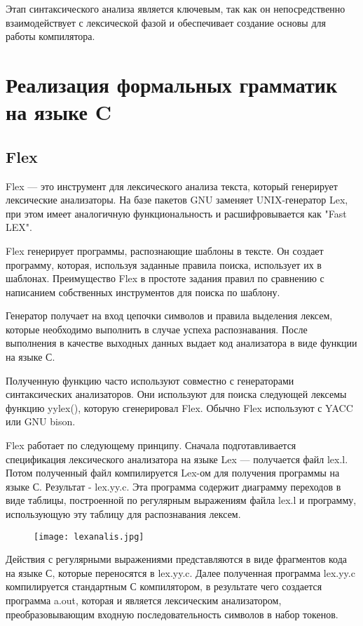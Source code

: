 \documentclass[bachelor, och, coursework, times]{SCWorks}
\begin{document}
Этап синтаксического анализа является ключевым, так как он непосредственно взаимодействует с лексической фазой и обеспечивает создание основы для работы компилятора.~\cite{Compilers}

\section{Реализация формальных грамматик на языке C}
\subsection{Flex}

Flex --- это инструмент для лексического анализа текста, который генерирует лексические анализаторы. На базе пакетов GNU заменяет UNIX-генератор Lex, при этом имеет аналогичную функциональность и расшифровывается как "Fast LEX".

Flex генерирует программы, распознающие шаблоны в тексте. Он создает программу, которая, используя заданные правила поиска, использует их в шаблонах. Преимущество Flex в простоте задания правил по сравнению с написанием собственных инструментов для поиска по шаблону.

Генератор получает на вход цепочки символов и правила выделения лексем, которые необходимо выполнить в случае успеха распознавания. После выполнения в качестве выходных данных выдает код анализатора в виде функции на языке С.

Полученную функцию часто используют совместно с генераторами синтаксических анализаторов. Они используют для поиска следующей лексемы функцию yylex(), которую сгенерировал Flex. Обычно Flex используют с YACC или GNU bison. 

Flex работает по следующему принципу. Сначала подготавливается спецификация лексического анализатора на языке Lex --- получается файл lex.l. Потом полученный файл компилируется Lex-ом для получения программы на языке С. Результат - lex.yy.c. Эта программа содержит диаграмму переходов в виде таблицы, построенной по регулярным выражениям файла lex.l и программу, использующую эту таблицу для распознавания лексем.

\begin{figure}  [!ht]
	\centering
	\texttt{[image: lexanalis.jpg]}
\end{figure}

Действия с регулярными выражениями представляются в виде фрагментов кода на языке С, которые переносятся в lex.yy.c. Далее полученная программа lex.yy.c компилируется стандартным С компилятором, в результате чего создается программа a.out, которая и является лексическим анализатором, преобразовывающим входную последовательность символов в набор токенов.
\end{document}
